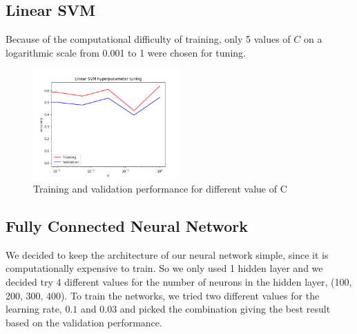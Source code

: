 \documentclass[letterpaper, 10 pt, conference]{ieeeconf}  %
\begin{document}
\subsection{Linear SVM}
Because of the computational difficulty of training, only 5 values of $C$ on a logarithmic scale from 0.001 to 1 were chosen for tuning. 
\begin{figure}[h]
	\begin{center}
		\includegraphics[width=0.5\textwidth]{figures/svm_tuning.png}  %
		\caption{Training and validation performance for different value of C}
		\label{fig:svmtuning}
	\end{center}
\end{figure}

\subsection{Fully Connected Neural Network}
We decided to keep the architecture of our neural network simple, since it is computationally expensive to train. So we only used 1 hidden layer and we decided try 4 different values for the number of neurons in the hidden layer, (100, 200, 300, 400).
To train the networks, we tried two different values for the learning rate, $0.1$ and $0.03$ and picked the combination giving the best result based on the validation performance.
\end{document}
